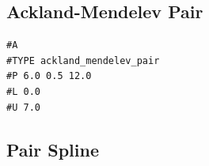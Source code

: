 





\clearpage
\FloatBarrier
\subsection{Ackland-Mendelev Pair}



\begin{lstlisting}[style=sPseudo,caption={Ackland-Mendelev Pair}]
#A
#TYPE ackland_mendelev_pair
#P 6.0 0.5 12.0
#L 0.0
#U 7.0
\end{lstlisting}








\clearpage
\FloatBarrier
\subsection{Pair Spline}



